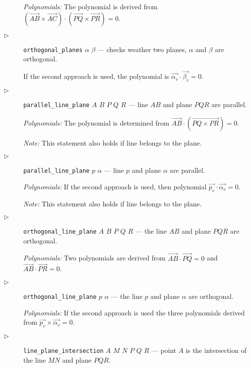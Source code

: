 \documentclass[final,1p,times,authoryear]{elsarticle}
\begin{document}
\begin{description}
  {\em Polynomials:} The polynomial is derived from
  $(\overrightarrow{AB} \times \overrightarrow{AC}) \cdot
  (\overrightarrow{PQ} \times \overrightarrow{PR}) = 0$.

\item[$\triangleright$] {\tt orthogonal\_planes} $\alpha$ $\beta$ ---
  checks weather two planes, $\alpha$ and $\beta$ are orthogonal.


If the second approach is used, the polynomial is
$\overrightarrow{\alpha_v} \cdot \overrightarrow{\beta_v} = 0$.

\item[$\triangleright$] {\tt parallel\_line\_plane} $A$ $B$ $P$ $Q$ $R$ ---
  line $AB$ and plane $PQR$ are parallel.

  {\em Polynomials:} The polynomial is determined from
  $\overrightarrow{AB} \cdot (\overrightarrow{PQ \times PR}) = 0$.

{\em Note:} This statement also holds if line belongs to the plane.

\item[$\triangleright$] {\tt parallel\_line\_plane} $p$ $\alpha$ ---
  line $p$ and plane $\alpha$ are parallel.

  {\em Polynomials:} If the second approach is used, then polynomial
  $\overrightarrow{p_v} \cdot \overrightarrow{\alpha_v} = 0$.

{\em Note:} This statement also holds if line belongs to the plane.

\item[$\triangleright$] {\tt orthogonal\_line\_plane} $A$ $B$ $P$ $Q$
  $R$ --- the line $AB$ and plane $PQR$ are orthogonal.

  {\em Polynomials:} Two polynomials are derived from
  $\overrightarrow{AB} \cdot \overrightarrow{PQ} = 0$ and
  $\overrightarrow{AB} \cdot \overrightarrow{PR} = 0$.

\item[$\triangleright$] {\tt orthogonal\_line\_plane} $p$ $\alpha$ ---
  the line $p$ and plane $\alpha$ are orthogonal.

  {\em Polynomials:} If the second approach is used the three
  polynomials derived from
  $\overrightarrow{p_v} \times \overrightarrow{\alpha_v} = 0$.

\item[$\triangleright$] {\tt line\_plane\_intersection} $A$ $M$ $N$
  $P$ $Q$ $R$ --- point $A$ is the intersection of the line $MN$ and
  plane $PQR$.


\end{description}
\end{document}
